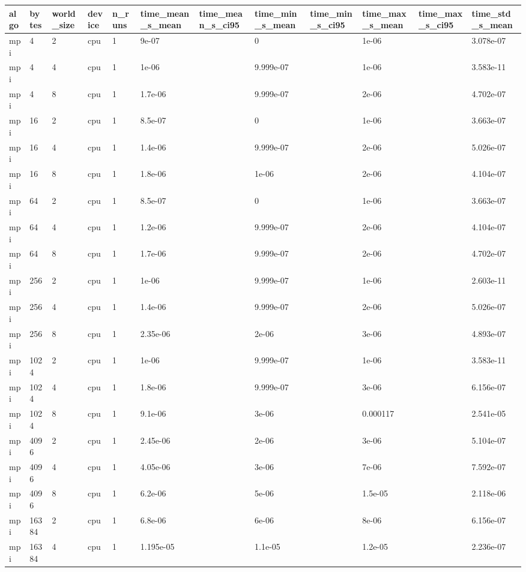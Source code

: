 \begin{tabular}{llllllllllll}
\hline
algo & bytes & world\_size & device & n\_runs & time\_mean\_s\_mean & time\_mean\_s\_ci95 & time\_min\_s\_mean & time\_min\_s\_ci95 & time\_max\_s\_mean & time\_max\_s\_ci95 & time\_std\_s\_mean \\
\hline
mpi & 4 & 2 & cpu & 1 & 9e-07 &  & 0 &  & 1e-06 &  & 3.078e-07 \\
mpi & 4 & 4 & cpu & 1 & 1e-06 &  & 9.999e-07 &  & 1e-06 &  & 3.583e-11 \\
mpi & 4 & 8 & cpu & 1 & 1.7e-06 &  & 9.999e-07 &  & 2e-06 &  & 4.702e-07 \\
mpi & 16 & 2 & cpu & 1 & 8.5e-07 &  & 0 &  & 1e-06 &  & 3.663e-07 \\
mpi & 16 & 4 & cpu & 1 & 1.4e-06 &  & 9.999e-07 &  & 2e-06 &  & 5.026e-07 \\
mpi & 16 & 8 & cpu & 1 & 1.8e-06 &  & 1e-06 &  & 2e-06 &  & 4.104e-07 \\
mpi & 64 & 2 & cpu & 1 & 8.5e-07 &  & 0 &  & 1e-06 &  & 3.663e-07 \\
mpi & 64 & 4 & cpu & 1 & 1.2e-06 &  & 9.999e-07 &  & 2e-06 &  & 4.104e-07 \\
mpi & 64 & 8 & cpu & 1 & 1.7e-06 &  & 9.999e-07 &  & 2e-06 &  & 4.702e-07 \\
mpi & 256 & 2 & cpu & 1 & 1e-06 &  & 9.999e-07 &  & 1e-06 &  & 2.603e-11 \\
mpi & 256 & 4 & cpu & 1 & 1.4e-06 &  & 9.999e-07 &  & 2e-06 &  & 5.026e-07 \\
mpi & 256 & 8 & cpu & 1 & 2.35e-06 &  & 2e-06 &  & 3e-06 &  & 4.893e-07 \\
mpi & 1024 & 2 & cpu & 1 & 1e-06 &  & 9.999e-07 &  & 1e-06 &  & 3.583e-11 \\
mpi & 1024 & 4 & cpu & 1 & 1.8e-06 &  & 9.999e-07 &  & 3e-06 &  & 6.156e-07 \\
mpi & 1024 & 8 & cpu & 1 & 9.1e-06 &  & 3e-06 &  & 0.000117 &  & 2.541e-05 \\
mpi & 4096 & 2 & cpu & 1 & 2.45e-06 &  & 2e-06 &  & 3e-06 &  & 5.104e-07 \\
mpi & 4096 & 4 & cpu & 1 & 4.05e-06 &  & 3e-06 &  & 7e-06 &  & 7.592e-07 \\
mpi & 4096 & 8 & cpu & 1 & 6.2e-06 &  & 5e-06 &  & 1.5e-05 &  & 2.118e-06 \\
mpi & 16384 & 2 & cpu & 1 & 6.8e-06 &  & 6e-06 &  & 8e-06 &  & 6.156e-07 \\
mpi & 16384 & 4 & cpu & 1 & 1.195e-05 &  & 1.1e-05 &  & 1.2e-05 &  & 2.236e-07 \\

\end{tabular}
